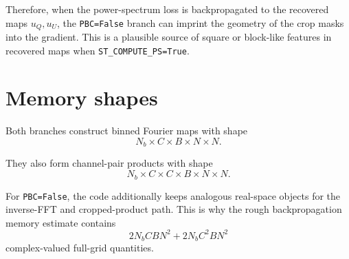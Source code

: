 \documentclass[11pt]{article}
\begin{document}
Therefore, when the power-spectrum loss is backpropagated to the recovered
maps $u_Q,u_U$, the \texttt{PBC=False} branch can imprint the geometry of the
crop masks into the gradient. This is a plausible source of square or block-like
features in recovered maps when \texttt{ST\_COMPUTE\_PS=True}.

\section{Memory shapes}

Both branches construct binned Fourier maps with shape
\[
  N_b\times C\times B\times N\times N.
\]

They also form channel-pair products with shape
\[
  N_b\times C\times C\times B\times N\times N.
\]

For \texttt{PBC=False}, the code additionally keeps analogous real-space
objects for the inverse-FFT and cropped-product path. This is why the rough
backpropagation memory estimate contains
\[
  2N_bCBN^2 + 2N_bC^2BN^2
\]
complex-valued full-grid quantities.
\end{document}
